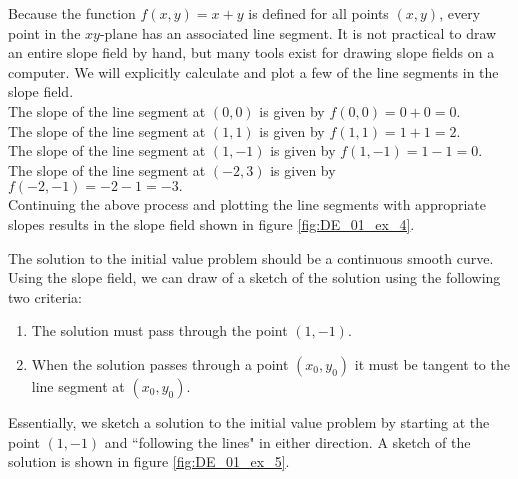 {Because the function $f(x,y) = x+y$ is defined for all points $(x,y)$, every point in the $xy$-plane has an associated line segment. It is not practical to draw an entire slope field by hand, but many tools exist for drawing slope fields on a computer.  We will explicitly calculate and plot a few of the line segments in the slope field.\\

\noindent The slope of the line segment at $(0,0)$ is given by $f(0,0) = 0 + 0 = 0.$\\

\noindent The slope of the line segment at $(1,1)$ is given by $f(1,1) = 1 + 1 = 2.$\\

\noindent The slope of the line segment at $(1,-1)$ is given by $f(1,-1) = 1 - 1 = 0.$\\

\noindent The slope of the line segment at $(-2,3)$ is given by $f(-2,-1) = -2 - 1 = -3.$\\

Continuing the above process and plotting the line segments with appropriate slopes results in the slope field shown in figure \ref{fig:DE_01_ex_4}.
}\\



{The solution to the initial value problem should be a continuous smooth curve.  Using the slope field, we can draw of a sketch of the solution using the following two criteria:

\begin{enumerate}
\item The solution must pass through the point $(1,-1)$.
\item When the solution passes through a point $(x_0,y_0)$ it must be tangent to the line segment at $(x_0,y_0)$.
\end{enumerate}
Essentially, we sketch a solution to the initial value problem by starting at the point $(1,-1)$ and ``following the lines" in either direction.  A sketch of the solution is shown in figure \ref{fig:DE_01_ex_5}.
}\\

